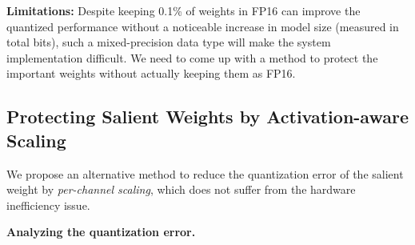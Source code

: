 \textbf{Limitations: }
Despite keeping 0.1\% of weights in FP16 can improve the quantized performance without a noticeable increase in model size (measured in total bits), such a mixed-precision data type will make the system implementation difficult. We need to come up with a method to protect the important weights without actually keeping them as FP16. 


\subsection{Protecting Salient Weights by Activation-aware Scaling}
We propose an alternative method to reduce the quantization error of the salient weight by \emph{per-channel scaling}, which does not suffer from the hardware inefficiency issue. 

\textbf{Analyzing the quantization error.}


